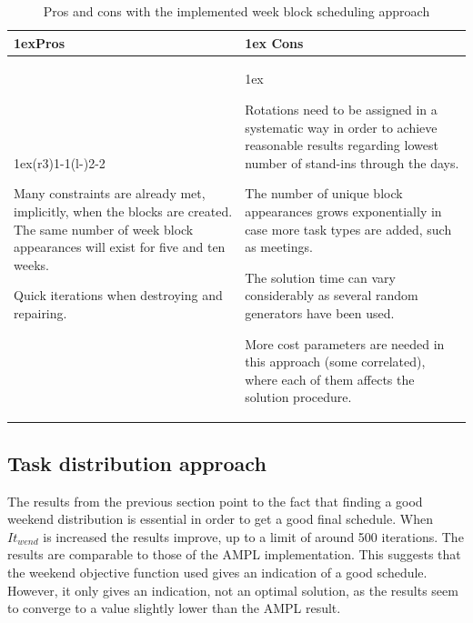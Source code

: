 \begin{table}[H]
\caption{Pros and cons with the implemented week block scheduling approach}
\label{tab:pros_cons_weekly_scheduling}
\begin{tabularx}{\linewidth}{>{\parskip1ex}X@{\kern4\tabcolsep}>{\parskip1ex}X}
\toprule
\hfil\bfseries Pros
&
\hfil\bfseries Cons
\\\cmidrule(r{3\tabcolsep}){1-1}\cmidrule(l{-\tabcolsep}){2-2}

Many constraints are already met, implicitly, when the blocks are created.
The same number of week block appearances will exist for five and ten weeks.\par
Quick iterations when destroying and repairing.\par

&

Rotations need to be assigned in a systematic way in order to achieve reasonable results regarding lowest number of stand-ins through the days.\par
The number of unique block appearances grows exponentially in case more task types are added, such as meetings.\par
The solution time can vary considerably as several random generators have been used.\par
More cost parameters are needed in this approach (some correlated), where each of them affects the solution procedure.

\\\bottomrule
\end{tabularx}
\end{table}

 

\subsection{Task distribution approach}
The results from the previous section point to the fact that finding a good weekend distribution is essential in order to get a good final schedule. When $It_{wend}$ is increased the results improve, up to a limit of around 500 iterations. The results are comparable to those of the AMPL implementation. This suggests that the weekend objective function used gives an indication of a good schedule. However, it only gives an indication, not an optimal solution, as the results seem to converge to a value slightly lower than the AMPL result. 

